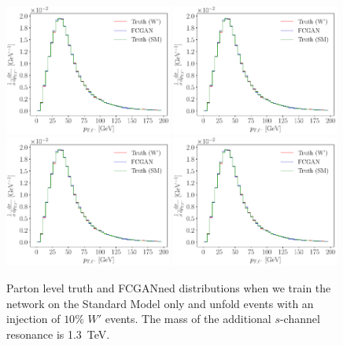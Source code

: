 \begin{figure}[t]
\centering
\includegraphics[page = 9, width=0.49\textwidth]{figures/cGAN/6f_plots_mix}
\includegraphics[page = 1, width=0.49\textwidth]{figures/cGAN/6f_plots_mix}\\
\includegraphics[page = 17, width=0.49\textwidth]{figures/cGAN/6f_plots_mix}
\includegraphics[page = 18, width=0.49\textwidth]{figures/cGAN/6f_plots_mix}
\caption{Parton level truth and FCGANned distributions when we train
  the network on the Standard Model only and unfold events with an
  injection of $10\%$ $W'$ events. The mass of the
  additional $s$-channel resonance is 1.3~TeV.}
\label{fig:w_prime}
\end{figure}


